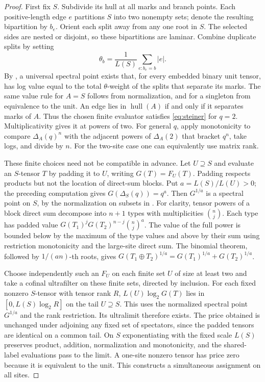 \documentclass[11pt]{article}
\theoremstyle{remark}
\newcommand{\hull}{\operatorname{hull}}
\newcommand{\D}{\Delta}
\begin{document}
\begin{proof}
First fix \(S\). Subdivide its hull at all marks and branch points. Each positive-length edge \(e\) partitions \(S\) into two nonempty sets; denote the resulting bipartition by \(b_e\). Orient each split away from any one root in \(S\). The selected sides are nested or disjoint, so these bipartitions are laminar. Combine duplicate splits by setting
\[
 \theta_b=\frac{1}{L(S)}\sum_{e:b_e=b}|e|.
\]
By \cite[Proposition~4.3, Theorem~4.6, and Lemma~4.13]{Botero}, a universal spectral point exists that, for every embedded binary unit tensor, has log value equal to the total \(\theta\)-weight of the splits that separate its marks. The same value rule for \(A=S\) follows from normalization, and for a singleton from equivalence to the unit. An edge lies in \(\hull(A)\) if and only if it separates marks of \(A\). Thus the chosen finite evaluator satisfies \eqref{eq:steiner} for \(q=2\). Multiplicativity gives it at powers of two. For general \(q\), apply monotonicity to compare \(\D_A(q)^n\) with the adjacent powers of \(\D_A(2)\) that bracket \(q^n\), take logs, and divide by \(n\). For the two-site case one can equivalently use matrix rank.

These finite choices need not be compatible in advance. Let \(U\supseteq S\) and evaluate an \(S\)-tensor \(T\) by padding it to \(U\), writing \(G(T)=F_U(T)\). Padding respects products but not the location of direct-sum blocks. Put \(a=L(S)/L(U)>0\); the preceding computation gives \(G(\D_S(q))=q^a\). Then \(G^{1/a}\) is a spectral point on \(S\), by the normalization on subsets in \cite[Section~2.2]{OpenAI}. For clarity, tensor powers of a block direct sum decompose into \(n+1\) types with multiplicities \(\binom nj\). Each type has padded value \(G(T_1)^jG(T_2)^{n-j}\binom nj^a\). The value of the full power is bounded below by the maximum of the type values and above by their sum using restriction monotonicity and the large-site direct sum. The binomial theorem, followed by \(1/(an)\)-th roots, gives \(G(T_1\oplus T_2)^{1/a}=G(T_1)^{1/a}+G(T_2)^{1/a}\).

Choose independently such an \(F_U\) on each finite set \(U\) of size at least two and take a cofinal ultrafilter on these finite sets, directed by inclusion. For each fixed nonzero \(S\)-tensor with tensor rank \(R\), \(L(U)\log_2G(T)\) lies in \([0,L(S)\log_2 R]\) on the tail \(U\supseteq S\). This uses the normalized spectral point \(G^{1/a}\) and the rank restriction. Its ultralimit therefore exists. The price obtained is unchanged under adjoining any fixed set of spectators, since the padded tensors are identical on a common tail. On \(S\) exponentiating with the fixed scale \(L(S)\) preserves product, addition, normalization and monotonicity, and the shared-label evaluations pass to the limit. A one-site nonzero tensor has price zero because it is equivalent to the unit. This constructs a simultaneous assignment on all sites.
\end{proof}
\end{document}
